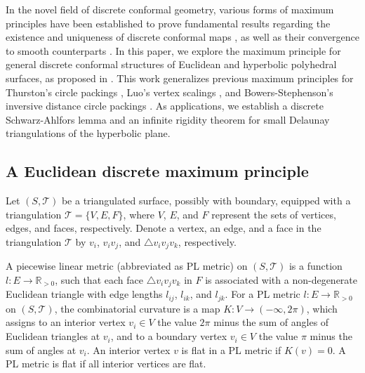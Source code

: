 \documentclass[12pt]{amsart}
\theoremstyle{definition}
\begin{document}
In the novel field of discrete conformal geometry, various forms of maximum principles have been established to prove fundamental results regarding the existence and uniqueness of discrete conformal maps \cite{Thurston, Gu1, Gu2, BL-E, BL-H}, as well as their convergence to smooth counterparts \cite{RS, HS1996, LSW, Bucking}.
In this paper, we explore the maximum principle for general discrete conformal structures of Euclidean and hyperbolic polyhedral surfaces, as proposed in \cite{Glickenstein JDG, G-T, ZGZLYG}.
This work generalizes previous maximum principles for Thurston's circle packings \cite{Thurston}, Luo's vertex scalings \cite{Luo CCM}, and Bowers-Stephenson's  inversive distance circle packings \cite{BS}.
As applications, we establish a discrete Schwarz-Ahlfors lemma and an infinite rigidity theorem for small Delaunay triangulations of the hyperbolic plane.


\subsection{A Euclidean discrete maximum principle}\label{Sec: 1.1}

Let $(S,\mathcal{T})$ be a triangulated surface, possibly with boundary, equipped with a triangulation $\mathcal{T}=\{V,E,F\}$,
where $V$, $E$, and $F$ represent the sets of vertices, edges, and faces, respectively.
Denote a vertex, an edge, and a face in the triangulation $\mathcal{T}$ by $v_i$, $v_iv_j$, and $\triangle v_iv_jv_k$, respectively.

A piecewise linear metric (abbreviated as PL metric) on $(S, \mathcal{T})$ is a function $l: E \rightarrow \mathbb{R}_{>0}$,
such that each face $\triangle v_iv_jv_k$ in $F$ is associated with a non-degenerate Euclidean triangle with edge lengths $l_{ij}$, $l_{ik}$, and $l_{jk}$.
For a PL metric $l: E \rightarrow \mathbb{R}_{>0}$ on $(S, \mathcal{T})$,
the combinatorial curvature is a map $K: V \rightarrow (-\infty, 2\pi)$,
which assigns to an interior vertex $v_i \in V$ the value $2\pi$ minus the sum of angles of Euclidean triangles at $v_i$,
and to a boundary vertex $v_i \in V$ the value $\pi$ minus the sum of angles at $v_i$.
An interior vertex $v$ is flat in a PL metric if $K(v)=0$.
A PL metric is flat if all interior vertices are flat.
\end{document}
